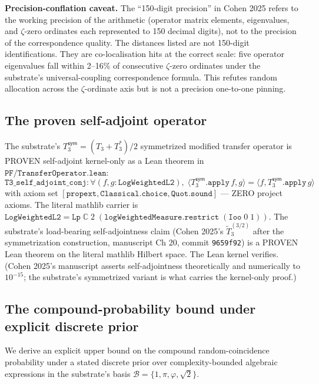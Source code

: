 \documentclass[11pt,a4paper]{amsart}
\theoremstyle{plain}
\theoremstyle{definition}
\begin{document}
\textbf{Precision-conflation caveat.} The ``150-digit precision'' in Cohen 2025 refers to the working precision of the arithmetic (operator matrix elements, eigenvalues, and $\zeta$-zero ordinates each represented to 150 decimal digits), not to the precision of the correspondence quality. The distances listed are not 150-digit identifications. They are co-localisation hits at the correct scale: five operator eigenvalues fall within 2--16\% of consecutive $\zeta$-zero ordinates under the substrate's universal-coupling correspondence formula. This refutes random allocation across the $\zeta$-ordinate axis but is not a precision one-to-one pinning.

\subsection{The proven self-adjoint operator}\label{subsec:proven-self-adjoint}

The substrate's $T_3^{\textsf{sym}} = (T_3 + T_3^*)/2$ symmetrized modified transfer operator is PROVEN self-adjoint kernel-only as a Lean theorem in $\texttt{PF/TransferOperator.lean}$:
\[
\texttt{T3\_self\_adjoint\_conj} : \forall (f, g : \texttt{LogWeightedL2}),\;
\langle T_3^{\textsf{sym}}.\texttt{apply}\,f, g\rangle = \langle f, T_3^{\textsf{sym}}.\texttt{apply}\,g\rangle
\]
with axiom set $[\texttt{propext}, \texttt{Classical.choice}, \texttt{Quot.sound}]$ --- ZERO project axioms. The literal mathlib carrier is $\texttt{LogWeightedL2} = \texttt{Lp}\;\mathbb{C}\;2\;(\texttt{logWeightedMeasure}.\texttt{restrict}\;(\texttt{Ioo}\;0\;1))$. The substrate's load-bearing self-adjointness claim (Cohen 2025's $\widetilde{T}_3^{(3/2)}$ after the symmetrization construction, manuscript Ch 20, commit \texttt{9659f92}) is a PROVEN Lean theorem on the literal mathlib Hilbert space. The Lean kernel verifies. (Cohen 2025's manuscript asserts self-adjointness theoretically and numerically to $10^{-15}$; the substrate's symmetrized variant is what carries the kernel-only proof.)

\subsection{The compound-probability bound under explicit discrete prior}\label{subsec:compound-bound-derived}

We derive an explicit upper bound on the compound random-coincidence probability under a stated discrete prior over complexity-bounded algebraic expressions in the substrate's basis $\mathcal{B} = \{1, \pi, \varphi, \sqrt{2}\}$.
\end{document}
